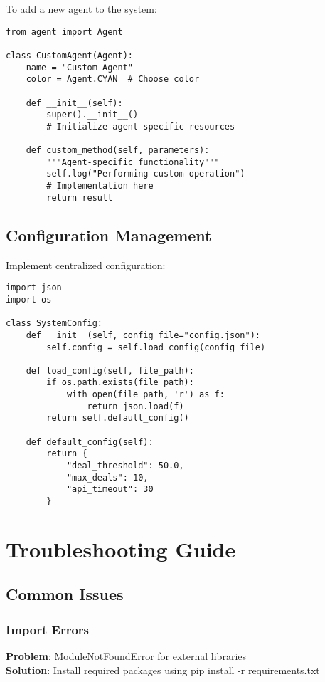\documentclass[12pt,twoside,openright]{book}
\begin{document}
To add a new agent to the system:

\begin{lstlisting}[caption=New Agent Template]
from agent import Agent

class CustomAgent(Agent):
    name = "Custom Agent"
    color = Agent.CYAN  # Choose color
    
    def __init__(self):
        super().__init__()
        # Initialize agent-specific resources
    
    def custom_method(self, parameters):
        """Agent-specific functionality"""
        self.log("Performing custom operation")
        # Implementation here
        return result
\end{lstlisting}

\section{Configuration Management}

Implement centralized configuration:

\begin{lstlisting}[caption=Configuration System]
import json
import os

class SystemConfig:
    def __init__(self, config_file="config.json"):
        self.config = self.load_config(config_file)
    
    def load_config(self, file_path):
        if os.path.exists(file_path):
            with open(file_path, 'r') as f:
                return json.load(f)
        return self.default_config()
    
    def default_config(self):
        return {
            "deal_threshold": 50.0,
            "max_deals": 10,
            "api_timeout": 30
        }
\end{lstlisting}

\chapter{Troubleshooting Guide}

\section{Common Issues}

\subsection{Import Errors}
\textbf{Problem}: ModuleNotFoundError for external libraries\\
\textbf{Solution}: Install required packages using pip install -r requirements.txt
\end{document}
